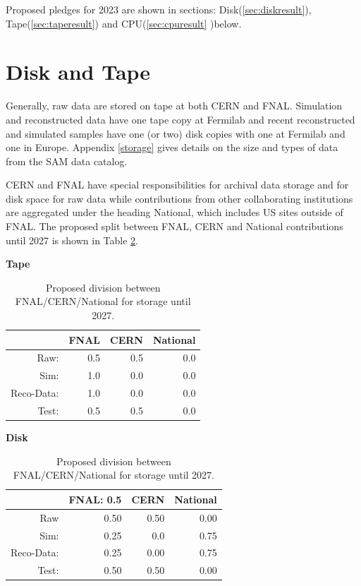 \documentclass[12pt]{article}
\begin{document}
Proposed pledges for 2023 are  shown in sections: Disk(\ref{sec:diskresult}), Tape(\ref{sec:taperesult}) and CPU(\ref{sec:cpuresult} )below. 
\clearpage

\section{Disk and Tape}

Generally, raw data are stored on tape at both CERN and FNAL.  Simulation and reconstructed data  have one tape copy at Fermilab and recent reconstructed and simulated samples have one (or two) disk copies with one at Fermilab and one in Europe.  Appendix \ref{storage} gives details on the size and types of data from the SAM data catalog.

CERN and FNAL have special responsibilities for archival data storage and for disk space for raw data while contributions from  other collaborating institutions are aggregated under the heading National, which includes US sites outside of FNAL.  The proposed split between FNAL, CERN and National contributions until 2027 is shown in Table \ref{tab:division}.  

\begin{table}[h]
\begin{centering}
{\bf Tape}
\begin{tabular}{|rrrr|}
\hline
 &FNAL&CERN & National \\
 \hline
Raw:&  0.5&  0.5&  0.0\\
Sim:& 1.0&   0.0&   0.0\\ 
Reco-Data:& 1.0&   0.0&   0.0\\
Test: &  0.5&   0.5&  0.0\\

 \hline
  \end{tabular}

   {\bf Disk}
     \begin{tabular}{|rrrr|}
     \hline
 &FNAL: 0.5&CERN & National \\
 \hline
 Raw&   0.50&   0.50&  0.00\\ 
 Sim: & 0.25&  0.0&  0.75\\
  Reco-Data: &  0.25&   0.00&  0.75\\ 
  Test: &  0.50& 0.50&   0.00\\
  \hline
   \end{tabular}
  \caption{Proposed division between FNAL/CERN/National for storage until 2027.}

   \label{tab:division}
   \end{centering}
   \end{table}
\end{document}
